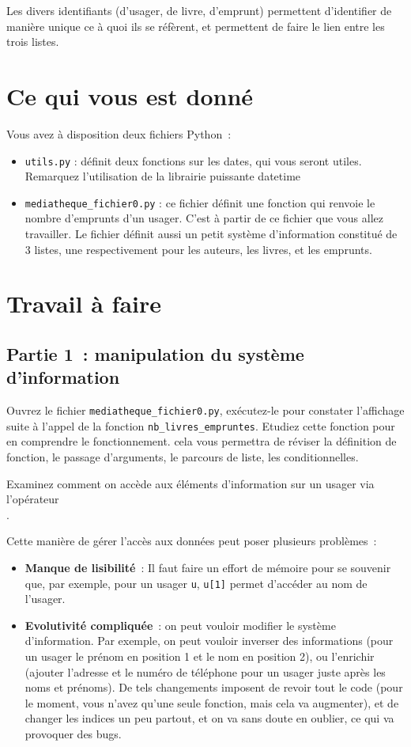 \documentclass[10pt,a4paper,onecolumn]{article}
\begin{document}
Les divers identifiants (d'usager, de livre, d'emprunt) permettent d'identifier de manière unique ce à quoi ils se réfèrent, et permettent de faire le lien entre les trois listes. 

\section{Ce qui vous est donné}

Vous avez à disposition deux fichiers Python~:

\begin{itemize}
\item \texttt{utils.py} : définit deux fonctions sur les dates, qui vous seront utiles. Remarquez l'utilisation de la librairie puissante datetime
\item \texttt{mediatheque\_fichier0.py} : ce fichier définit une fonction qui renvoie le nombre d'emprunts d'un usager. C'est à partir de ce fichier que vous allez travailler. Le fichier définit aussi un petit système d'information constitué de 3 listes, une respectivement pour les auteurs, les livres, et les emprunts.
\end{itemize}

\section{Travail à faire}


\subsection{Partie 1~: manipulation du système d'information}

Ouvrez le fichier \texttt{mediatheque\_fichier0.py}, exécutez-le pour constater l'affichage suite à l'appel de la fonction \texttt{nb\_livres\_empruntes}. Etudiez cette fonction pour en comprendre le fonctionnement. cela vous permettra de réviser la définition de fonction, le passage d'arguments, le parcours de liste, les conditionnelles. 

Examinez comment on accède aux éléments d'information sur un usager via l'opérateur \texttt{\[\]}. 

Cette manière de gérer l'accès aux données peut poser plusieurs problèmes~:

\begin{itemize}
\item \textbf{Manque de lisibilité}~: Il faut faire un effort de mémoire pour se souvenir que, par exemple, pour un usager \texttt{u}, \texttt{u[1]} permet d'accéder au nom de l'usager.
\item \textbf{Evolutivité compliquée}~: on peut vouloir modifier le système d'information. Par exemple, on peut vouloir inverser des informations (pour un usager le prénom en position 1 et le nom en position 2), ou l'enrichir (ajouter l'adresse et le numéro de téléphone pour un usager juste après les noms et prénoms). De tels changements imposent de revoir tout le code (pour le moment, vous n'avez qu'une seule fonction, mais cela va augmenter), et de changer les indices un peu partout, et on va sans doute en oublier, ce qui va provoquer des bugs.
\end{itemize}
\end{document}
